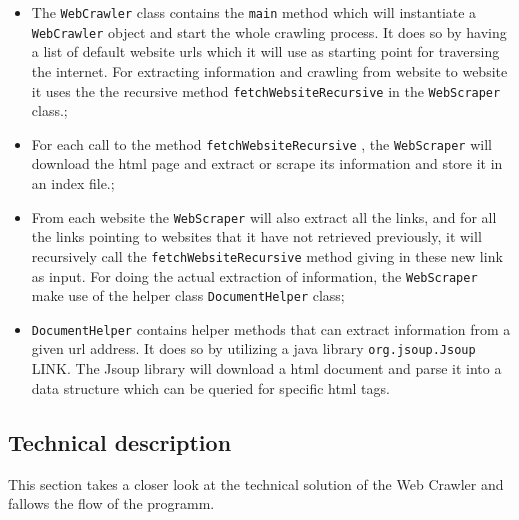 \begin{itemize}
\item The {\tt WebCrawler} class contains the {\tt main} method which will instantiate a {\tt WebCrawler} object and start the whole crawling process. It does so by having a list of default website urls which it will use as starting point for traversing the internet. For extracting information and crawling from website to website it uses the the recursive method {\tt fetchWebsiteRecursive} in the {\tt WebScraper} class.;
\item For each call to the method {\tt fetchWebsiteRecursive} , the {\tt WebScraper} will download the html page and extract or scrape its information and store it in an index file.;
\item From each website the {\tt WebScraper} will also extract all the links, and for all the links pointing to websites that it have not retrieved previously, it will recursively call the {\tt fetchWebsiteRecursive} method giving in these new link as input. For doing the actual extraction of  information, the {\tt WebScraper} make use of the helper class {\tt DocumentHelper} class;
\item {\tt DocumentHelper} contains helper methods that can extract information from a given url address. It does so by utilizing a java library {\tt org.jsoup.Jsoup} LINK. The Jsoup library will download a html document and parse it into a data structure which can be queried for specific html tags. 
\end{itemize}

\subsection{Technical description}
This section takes a closer look at the technical solution of the Web Crawler and fallows the flow of the programm. 


